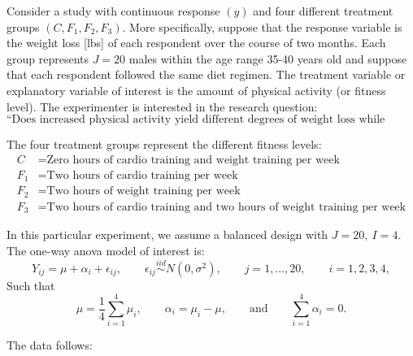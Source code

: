 \documentclass[letterpaper]{article}
\begin{document}
		Consider a study with continuous response $(y)$ and four different treatment groups $(C,F_1,F_2,F_3)$. More specifically, suppose that the response variable is the weight loss [lbs] of each respondent over the course of two months. Each group represents $J=20$ males within the age range 35-40 years old and suppose that each respondent followed the same diet regimen. The treatment variable or explanatory variable of interest is the amount of physical activity (or fitness level). The experimenter is interested in the research question:
		\[
		\text{``Does increased physical activity yield different degrees of weight loss while dieting?''}
		\]
		
		The four treatment groups represent the different fitness levels:
		\[
		\begin{aligned}
			C   & = \text{Zero hours of cardio training and weight training per week} \\
			F_1 & = \text{Two hours of cardio training per week} \\
			F_2 & = \text{Two hours of weight training per week} \\
			F_3 & = \text{Two hours of cardio training and two hours of weight training per week}
		\end{aligned}
		\]
		
		In this particular experiment, we assume a balanced design with $J=20,\ I=4$. The one-way anova model of interest is:
		\begin{equation}
			Y_{ij}=\mu+\alpha_i+\epsilon_{ij},
			\qquad
			\epsilon_{ij}\overset{iid}{\sim}N(0,\sigma^2),
			\qquad
			j=1,\ldots,20,
			\qquad
			i=1,2,3,4,
		\end{equation}
		Such that
		\begin{equation}
			\mu=\frac{1}{4}\sum_{i=1}^4 \mu_i,
			\qquad
			\alpha_i=\mu_i-\mu,
			\qquad \text{and} \qquad
			\sum_{i=1}^4 \alpha_i=0.
		\end{equation}
		
		The data follows:
		
\end{document}
